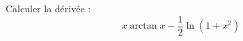 Calculer la d\'eriv\'ee :
\begin{displaymath}
 x\arctan x -\frac{1}{2}\ln (1+x^2)
\end{displaymath}
\bigskip
